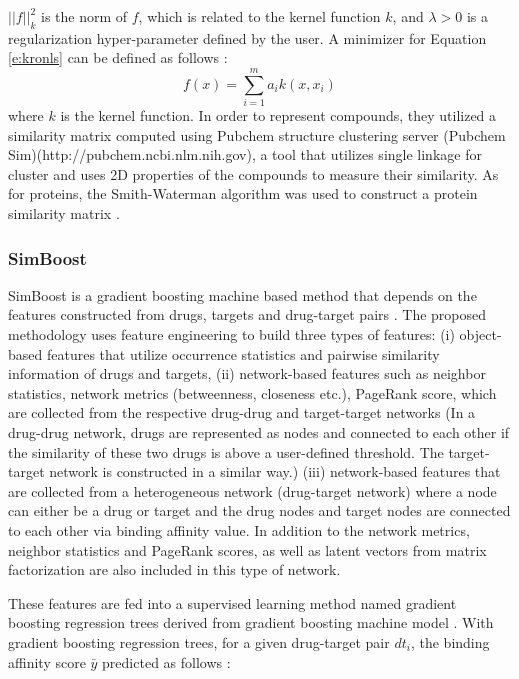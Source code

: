 \documentclass[11pt,letterpaper]{article}
\begin{document}
$||f||^2_k$ is the norm of $f$, which is related to the kernel function $k$, and
$\lambda>0$ is a regularization hyper-parameter defined by the user.  A minimizer for Equation \ref{e:kronls} can be defined as follows \cite{kimeldorf1971some}:
\begin{equation}\label{e:minimizer}
f(x) = \sum_{i=1}^m a_i k(x, x_i)
\end{equation}
where $k$ is the kernel function. In order to represent compounds, they utilized a similarity matrix   computed using Pubchem structure clustering server (Pubchem Sim)(http://pubchem.ncbi.nlm.nih.gov), a tool that utilizes single linkage for cluster and uses  2D properties of the compounds to measure their similarity. As for proteins, the Smith-Waterman algorithm was used to construct a protein similarity matrix \cite{smith1981identification}.

\subsubsection*{SimBoost}

SimBoost is a gradient boosting machine based method that depends on the features constructed from drugs, targets and drug-target pairs \cite{he2017simboost}.  The proposed methodology uses feature engineering to build three types of features: (i) object-based features that utilize occurrence statistics and pairwise similarity information of drugs and targets, (ii) network-based features such as neighbor statistics, network metrics (betweenness, closeness etc.), PageRank score, which are collected from the respective drug-drug and target-target networks (In a drug-drug network, drugs are represented as nodes and connected to each other if the similarity of these two drugs is above a user-defined threshold. The target-target network is constructed in a similar way.) (iii) network-based features that are collected from a heterogeneous network (drug-target network) where a node can either be a drug or target and the drug nodes and target nodes  are connected to each other via binding affinity value. In addition to the network metrics, neighbor statistics and PageRank scores, as well as latent vectors from matrix factorization are also included in this type of network.



These features are fed into a supervised learning method named gradient boosting regression trees \cite{chen2015higgs,chen2016xgboost} derived from gradient boosting machine model \cite{friedman2001greedy}. With gradient boosting regression trees, for a given drug-target pair $dt_i$, the binding affinity score $\bar{y}$ predicted as follows \cite{he2017simboost}:
\end{document}
